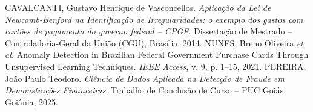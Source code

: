 \documentclass[
    12pt,               %
    openright,          %
    oneside,            %
    a4paper,            %
    chapter=TITLE,      %
    sumario=tradicional,%
    english,            %
    brazilian,          %
 ]{abntex2}
\begin{document}
\begin{thebibliography}{9}
 CAVALCANTI, Gustavo Henrique de Vasconcellos. \textit{Aplicação da Lei de Newcomb-Benford na Identificação de Irregularidades: o exemplo dos gastos com cartões de pagamento do governo federal – CPGF}. Dissertação de Mestrado -- Controladoria-Geral da União (CGU), Brasília, 2014.
 NUNES, Breno Oliveira \textit{et al.} Anomaly Detection in Brazilian Federal Government Purchase Cards Through Unsupervised Learning Techniques. \textit{IEEE Access}, v. 9, p. 1--15, 2021.
 PEREIRA, João Paulo Teodoro. \textit{Ciência de Dados Aplicada na Detecção de Fraude em Demonstrações Financeiras}. Trabalho de Conclusão de Curso -- PUC Goiás, Goiânia, 2025.
\end{thebibliography}
\end{document}
